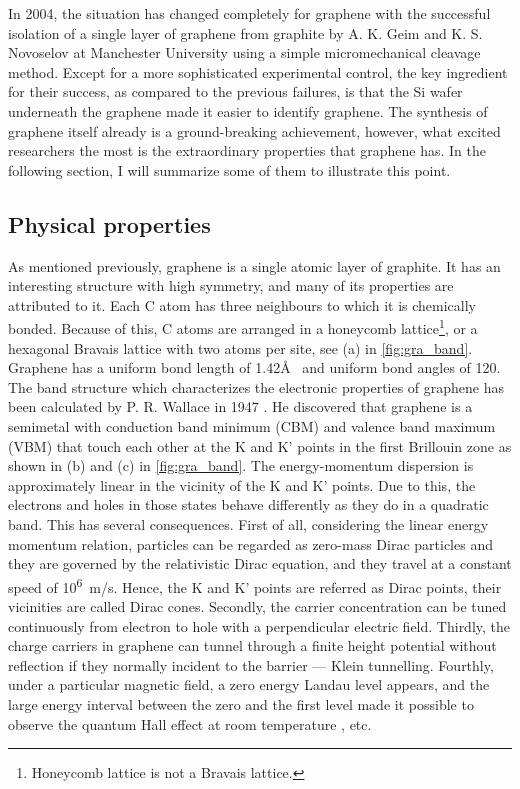 In 2004, the situation has changed completely for graphene with the successful isolation of a single layer of graphene from graphite by A. K. Geim and K. S. Novoselov at Manchester University using a simple micromechanical cleavage method. Except for a more sophisticated experimental control, the key ingredient for their success, as compared to the previous failures\cite{Krishnan1997,Ohashi1997}, is that the Si wafer underneath the graphene made it easier to identify graphene\cite{Geim2007}. The synthesis of graphene itself already is a ground-breaking achievement, however, what excited researchers the most is the extraordinary properties that graphene has. In the following section, I will summarize some of them to illustrate this point.

\subsection{Physical properties}

As mentioned previously, graphene is a single atomic layer of graphite. It has an interesting structure with high symmetry, and many of its properties are attributed to it. Each C atom has three neighbours to which it is chemically bonded. Because of this, C atoms are arranged in a honeycomb lattice\footnote{Honeycomb lattice is not a Bravais lattice.}, or a hexagonal Bravais lattice with two atoms per site, see (a) in \autoref{fig:gra_band}. Graphene has a uniform bond length of 1.42\AA~ and uniform bond angles of 120\textdegree. The band structure which characterizes the electronic properties of graphene has been calculated by P. R. Wallace in 1947 \cite{Wallace1947}. He discovered that graphene is a semimetal with conduction band minimum (CBM) and valence band maximum (VBM) that touch each other at the K and K' points in the first Brillouin zone as shown in (b) and (c) in \autoref{fig:gra_band}. The energy-momentum dispersion is approximately linear in the vicinity of the K and K' points. Due to this, the electrons and holes in those states behave differently as they do in a quadratic band. This has several consequences. First of all, considering the linear energy momentum relation, particles can be regarded as zero-mass Dirac particles and they are governed by the relativistic Dirac equation\cite{Novoselov2005}, and they travel at a constant speed of \si{10^6m/s}. Hence, the K and K' points are referred as Dirac points, their vicinities are called Dirac cones. Secondly, the carrier concentration can be tuned continuously from electron to hole with a perpendicular electric field\cite{Geim2007}. Thirdly, the charge carriers in graphene can tunnel through a finite height potential without reflection if they normally incident to the barrier — Klein tunnelling\cite{Katsnelson2006}. Fourthly, under a particular magnetic field, a zero energy Landau level appears, and the large energy interval between the zero and the first level made it possible to observe the quantum Hall effect at room temperature \cite{Novoselov1379}, etc.

